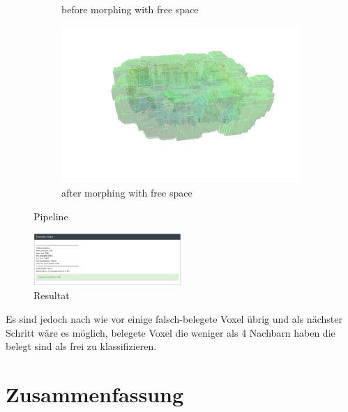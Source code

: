 \documentclass[12pt,titlepage, a4paper]{article}
\begin{document}
\begin{figure}[h!]
\begin{subfigure}[h]{0.45\textwidth}
		\caption{before morphing with free space}
	\end{subfigure}
	\begin{subfigure}[h]{0.45\textwidth}
		\includegraphics[width=\textwidth]{./maps/afterMorph_free.png}
		\caption{after morphing with free space}
	\end{subfigure}
 \caption{Pipeline}
\end{figure}

\begin{figure}[h!]
 \centering
 \includegraphics[width=0.5\textwidth]{./Screens/evaltask2.png}
 \caption{Resultat}
\end{figure}

Es sind jedoch nach wie vor einige falsch-belegete Voxel übrig und als nächster Schritt wäre es möglich, belegete Voxel die weniger als 4 Nachbarn haben die belegt sind als frei zu klassifizieren.

\section{Zusammenfassung}
  
  
\end{document}
